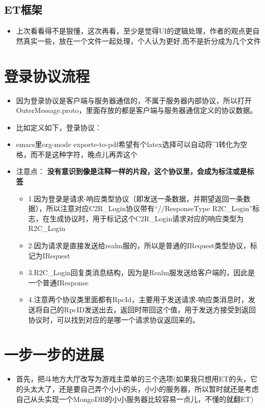 \documentclass[9pt, b5paper]{article}
\begin{document}
\subsection{ET框架}
\label{sec-2-3}
\begin{itemize}
\item 上次看看得不是狠懂，这次再看，至少是觉得UI的逻辑处理，作者的观点更自然真实一些，放在一个文件一起处理，个人认为更好,而不是折分成为几个文件
\end{itemize}
\section{登录协议流程}
\label{sec-3}
\begin{itemize}
\item 因为登录协议是客户端与服务器通信的，不属于服务器内部协议，所以打开OuterMessage.proto，里面存放的都是客户端与服务器通信定义的协议数据。
\item 比如定义如下，登录协议：
\item emacs里org-mode exporte-to-pdf希望有个latex选择可以自动将\^{}I转化为空格，而不是这种字符，晚点儿再弄这个
\item 注意点： \textbf{没有意识到像是注释一样的片段，这个协议里，会成为标注或是标签}
\begin{itemize}
\item 1.因为登录是请求-响应类型协议（即发送一条数据，并期望返回一条数据），所以注意对应C2R\_Login协议带有“//ResponseType R2C\_Login”标志，在生成协议时，用于标记这个C2R\_Login请求对应的响应类型为R2C\_Login
\item 2.因为请求是直接发送给realm服的，所以是普通的IRequest类型协议，标记为IRequest
\item 3.R2C\_Login回复类消息结构，因为是Realm服发送给客户端的，因此是一个普通IResponse
\item 4.注意两个协议类里面都有RpcId，主要用于发送请求-响应类消息时，发送将自己的RpcID发送出去，返回时带回这个值，用于发送方接受到返回协议时，可以找到对应的是哪一个请求协议返回来的。
\end{itemize}
\end{itemize}
\section{一步一步的进展}
\label{sec-4}
\begin{itemize}
\item 首先，把斗地方大厅改写为游戏主菜单的三个选项(如果我只想用ET的头，它的头太大了，还是要自己弄个小小的头，小小的服务器，所以暂时就还是考虑自己从头实现一个MongoDB的小小服务器比较容易一点儿，不懂的就翻ET)
\end{itemize}
\end{document}
